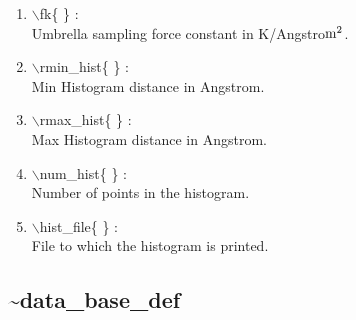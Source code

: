 \documentclass[12pt,titlepage]{article}
\begin{document}
\begin{enumerate}
 \vspace{0.15in} 
 \item  $\backslash$fk\{ \} : \\               
    Umbrella sampling force constant in K/Angstro${\rm m}^2$.

 \vspace{0.15in} 
 \item  $\backslash$rmin\_hist\{ \} : \\         
    Min Histogram distance in Angstrom.

 \vspace{0.15in} 
 \item  $\backslash$rmax\_hist\{ \} : \\         
    Max Histogram distance in Angstrom.

 \vspace{0.15in} 
 \item  $\backslash$num\_hist\{ \} : \\         
    Number of points in the histogram.
 
 \vspace{0.15in} 
 \item  $\backslash$hist\_file\{ \} : \\        
    File to which the histogram is printed.

\end{enumerate}

\newpage
\subsection*{\bf \~{}data\_base\_def}
\end{document}
